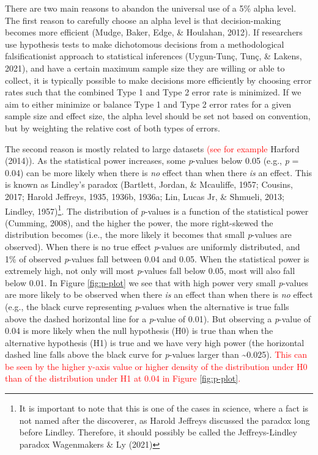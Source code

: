 \documentclass[
  english,
  ,man, a4paper,floatsintext]{apa6}
\begin{document}
There are two main reasons to abandon the universal use of a 5\% alpha level. The first reason to carefully choose an alpha level is that decision-making becomes more efficient (Mudge, Baker, Edge, \& Houlahan, 2012). If researchers use hypothesis tests to make dichotomous decisions from a methodological falsificationist approach to statistical inferences (Uygun-Tunç, Tunç, \& Lakens, 2021), and have a certain maximum sample size they are willing or able to collect, it is typically possible to make decisions more efficiently by choosing error rates such that the combined Type 1 and Type 2 error rate is minimized. If we aim to either minimize or balance Type 1 and Type 2 error rates for a given sample size and effect size, the alpha level should be set not based on convention, but by weighting the relative cost of both types of errors.

The second reason is mostly related to large datasets \textcolor{red}{(see for example} Harford (2014)). As the statistical power increases, some \emph{p}-values below 0.05 (e.g., \emph{p} = 0.04) can be more likely when there is \emph{no} effect than when there \emph{is} an effect. This is known as Lindley's paradox (Bartlett, Jordan, \& Mcauliffe, 1957; Cousins, 2017; Harold Jeffreys, 1935, 1936b, 1936a; Lin, Lucas Jr, \& Shmueli, 2013; Lindley, 1957)\footnote{It is important to note that this is one of the cases in science, where a fact is not named after the discoverer, as Harold Jeffreys discussed the paradox long before Lindley. Therefore, it should possibly be called the Jeffreys-Lindley paradox Wagenmakers \& Ly (2021)}. The distribution of \emph{p}-values is a function of the statistical power (Cumming, 2008), and the higher the power, the more right-skewed the distribution becomes (i.e., the more likely it becomes that small \emph{p}-values are observed). When there is no true effect \emph{p}-values are uniformly distributed, and 1\% of observed \emph{p}-values fall between 0.04 and 0.05. When the statistical power is extremely high, not only will most \emph{p}-values fall below 0.05, most will also fall below 0.01. In Figure \ref{fig:p-plot} we see that with high power very small \emph{p}-values are more likely to be observed when there \emph{is} an effect than when there is \emph{no} effect (e.g., the black curve representing \emph{p}-values when the alternative is true falls above the dashed horizontal line for a \emph{p}-value of 0.01). But observing a \emph{p}-value of 0.04 is more likely when the null hypothesis (H0) is true than when the alternative hypothesis (H1) is true and we have very high power (the horizontal dashed line falls above the black curve for \emph{p}-values larger than \textasciitilde0.025). \textcolor{red}{This can be seen by the higher y-axis value or higher density of the distribution under H0 than of the distribution under H1 at 0.04 in Figure \ref{fig:p-plot}.}
\end{document}

